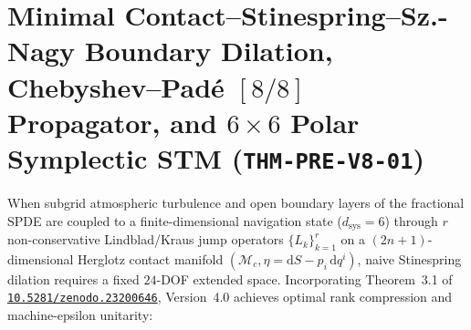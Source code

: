 \documentclass[11pt,a4paper,reqno]{article}
\newcommand{\zenodo}[1]{\href{https://doi.org/10.5281/zenodo.#1}{\nolinkurl{10.5281/zenodo.#1}}}
\theoremstyle{plain}
\theoremstyle{definition}
\theoremstyle{remark}
\numberwithin{equation}{section}
\begin{document}
\section{Minimal Contact--Stinespring--Sz.-Nagy Boundary Dilation, Chebyshev--Pad\'e \texorpdfstring{$[8/8]$}{[8/8]} Propagator, and \texorpdfstring{$6\times 6$}{6x6} Polar Symplectic STM (\texttt{THM-PRE-V8-01})}
\label{sec:minimal_stinespring_spde_v4}

When subgrid atmospheric turbulence and open boundary layers of the fractional SPDE are coupled to a finite-dimensional navigation state ($d_{\mathrm{sys}} = 6$) through $r$ non-conservative Lindblad/Kraus jump operators $\{L_k\}_{k=1}^r$ on a $(2n+1)$-dimensional Herglotz contact manifold $(\mathcal{M}_c, \eta = \mathrm{d}S - p_i\,\mathrm{d}q^i)$, naive Stinespring dilation requires a fixed $24$-DOF extended space. Incorporating Theorem~3.1 of \zenodo{23200646}, Version~4.0 achieves optimal rank compression and machine-epsilon unitarity:
\end{document}
